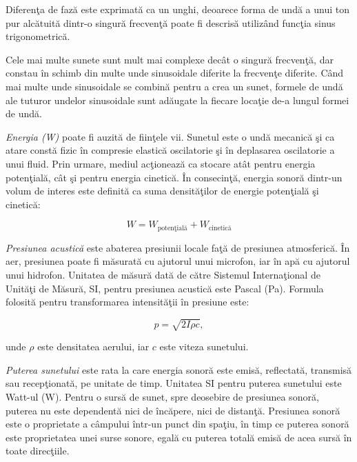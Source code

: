 	Diferen\c{t}a de faz\u{a} este exprimat\u{a} ca un unghi, deoarece forma de und\u{a} a unui ton pur alc\u{a}tuit\u{a} dintr-o singur\u{a} frecven\c{t}\u{a} poate fi descris\u{a} utiliz\^{a}nd func\c{t}ia sinus trigonometric\u{a}.	 
	
	Cele mai multe sunete sunt mult mai complexe dec\^{a}t o singur\u{a} frecven\c{t}\u{a}, dar constau \^{i}n schimb din multe unde sinusoidale diferite la frecven\c{t}e diferite. C\^{a}nd mai multe unde sinusoidale se combin\u{a} pentru a crea un sunet, formele de und\u{a} ale tuturor undelor sinusoidale sunt ad\u{a}ugate la fiecare loca\c{t}ie de-a lungul formei de und\u{a}.
	 	
	{\it{Energia (W)}} poate fi auzit\u{a} de fiin\c{t}ele vii. Sunetul este o und\u{a} mecanic\u{a} \c{s}i ca atare const\u{a} fizic \^{i}n compresie elastic\u{a} oscilatorie \c{s}i \^{i}n deplasarea oscilatorie a unui fluid. Prin urmare, mediul ac\c{t}ioneaz\u{a} ca stocare at\^{a}t pentru energia poten\c{t}ial\u{a}, c\^{a}t \c{s}i pentru energia cinetic\u{a}. \^{I}n consecin\c{t}\u{a}, energia sonor\u{a} dintr-un volum de interes este definit\u{a} ca suma densit\u{a}\c{t}ilor de energie poten\c{t}ial\u{a} \c{s}i cinetic\u{a}:
	
	\begin{equation}
	W = W_{\text{poten\c{t}ial\u{a}}} + W_{\text{cinetic\u{a}}}
	\end{equation}  
	
	{\it{Presiunea acustic\u{a}}} este abaterea presiunii locale fa\c{t}\u{a} de presiunea atmosferic\u{a}. \^{I}n aer, presiunea poate fi m\u{a}surat\u{a} cu ajutorul unui microfon, iar \^{i}n ap\u{a} cu ajutorul unui hidrofon. Unitatea de m\u{a}sur\u{a} dat\u{a} de c\u{a}tre Sistemul Interna\c{t}ional de Unit\u{a}\c{t}i de M\u{a}sur\u{a}, SI, pentru presiunea acustic\u{a} este Pascal (Pa). Formula folosit\u{a} pentru transformarea intensit\u{a}\c{t}ii \^{i}n presiune este:
	
	\begin{equation}
	p = \sqrt{2 I \rho c}, 
	\end{equation}
	
	\noindent unde $\rho$ este densitatea aerului, iar $c$ este viteza sunetului.	 
	
	{\it{Puterea sunetului}} este rata la care energia sonor\u{a} este emis\u{a}, reflectat\u{a}, transmis\u{a} sau recep\c{t}ionat\u{a}, pe unitate de timp. Unitatea SI pentru puterea sunetului este Watt-ul (W). Pentru o surs\u{a} de sunet, spre deosebire de presiunea sonor\u{a}, puterea nu este dependent\u{a} nici de \^{i}nc\u{a}pere, nici de distan\c{t}\u{a}. Presiunea sonor\u{a} este o proprietate a c\^{a}mpului \^{i}ntr-un punct din spa\c{t}iu, \^{i}n timp ce puterea sonor\u{a} este proprietatea unei surse sonore, egal\u{a} cu puterea total\u{a} emis\u{a} de acea surs\u{a} \^{i}n toate direc\c{t}iile.
	 	
